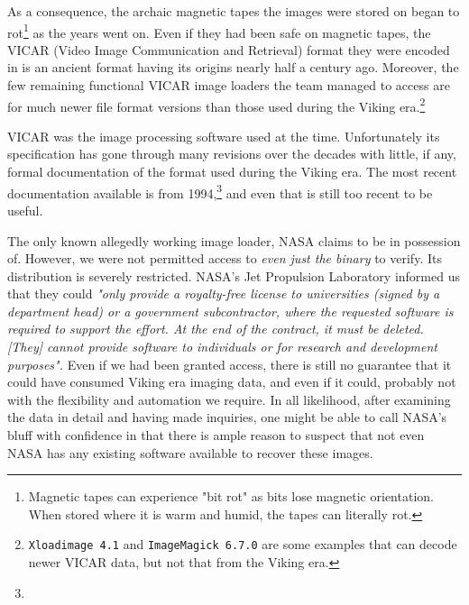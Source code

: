     {}

As a consequence, the archaic magnetic tapes the images were stored on began to rot\footnote{Magnetic tapes can experience "bit rot" as bits lose magnetic orientation. When stored where it is warm and humid, the tapes can literally rot.} as the years went on. Even if they had been safe on magnetic tapes, the VICAR (Video Image Communication and Retrieval) format they were encoded in is an ancient format having its origins nearly half a century ago. Moreover, the few remaining functional VICAR image loaders the team managed to access are for much newer file format versions than those used during the Viking era.\footnote{{\tt Xloadimage 4.1} and {\tt ImageMagick 6.7.0} are some examples that can decode newer VICAR data, but not that from the Viking era.}

VICAR was the image processing software used at the time. Unfortunately its specification has gone through many revisions over the decades with little, if any, formal documentation of the format used during the Viking era. The most recent documentation available is from 1994,\footnote{} and even that is still too recent to be useful.

The only known allegedly working image loader, NASA claims to be in possession of. However, we were not permitted access to {\it even just the binary} to verify. Its distribution is severely restricted. NASA's Jet Propulsion Laboratory informed us that they could {\it "only provide a royalty-free license to universities (signed by a department head) or a government subcontractor, where the requested software is required to support the effort. At the end of the contract, it must be deleted. [They] cannot provide software to individuals or for research and development purposes".} Even if we had been granted access, there is still no guarantee that it could have consumed Viking era imaging data, and even if it could, probably not with the flexibility and automation we require. In all likelihood, after examining the data in detail and having made inquiries, one might be able to call NASA's bluff with confidence in that there is ample reason to suspect that not even NASA has any existing software available to recover these images.

